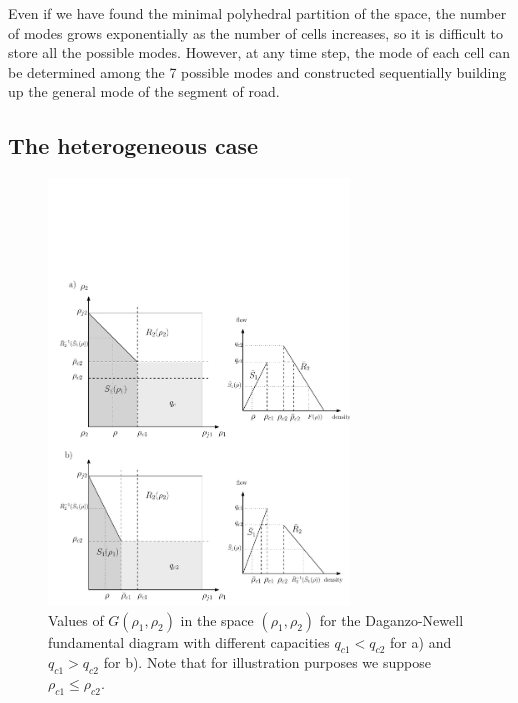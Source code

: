 Even if we have found the minimal polyhedral partition of the space, the number of modes grows exponentially as the number of cells increases, so it is difficult to store all the possible modes. However, at any time step, the mode of each cell can be determined among the 7 possible modes and constructed sequentially building up the general mode of the segment of road.


\subsection{The heterogeneous case}\label{sec:CDFD}

\begin{figure}[ht]
  \centering
    \includegraphics[width=8cm]{figures/godunovDiagram3.pdf}
    \caption{Values of $G(\rho_{1},\rho_{2})$ in the space $(\rho_{1},\rho_{2})$ for the Daganzo-Newell fundamental diagram with different capacities $q_{c1} < q_{c2}$ for a) and $q_{c1} > q_{c2}$ for b). Note that for illustration purposes we suppose $\rho_{c1}\leq\rho_{c2}$.}
    \label{fig:godunovDiagram3}
\end{figure}

